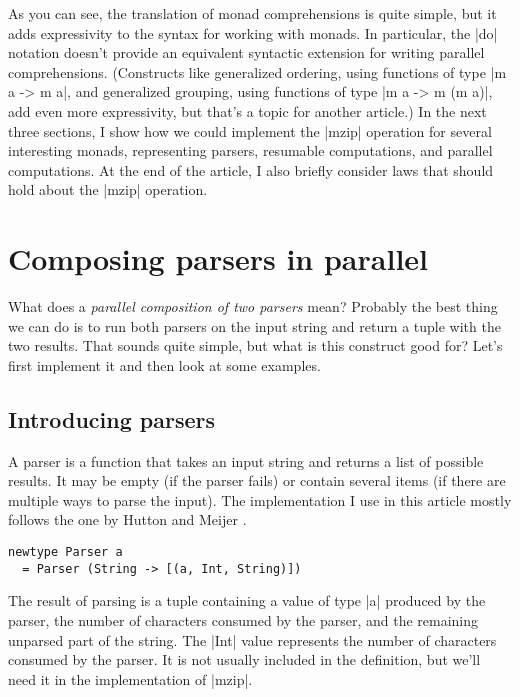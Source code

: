 \documentclass{tmr}
\newcommand{\authornote}[3]{}
\newcommand\bay[1]{\authornote{brent}{blue}{#1}}
\newcommand\tp[1]{\authornote{tomas}{red}{#1}}
\begin{document}
As you can see, the translation of monad comprehensions is quite simple, but it adds
expressivity to the syntax for working with monads. In particular, the |do| notation doesn't provide
an equivalent syntactic extension for writing parallel comprehensions. (Constructs like generalized 
ordering, using functions of type |m a -> m a|, and generalized
grouping, using functions of type
|m a -> m (m a)|, add even more expressivity, but that's a topic for another article.)
In the next three sections, I show how we could implement the |mzip| operation for several 
interesting monads, representing parsers, resumable computations, and
parallel computations. At the end of the article, I also briefly 
consider laws that should hold about the |mzip| operation.


\section{Composing parsers in parallel}
What does a \textit{parallel composition of two parsers} mean? Probably the best thing we can do 
is to run both parsers on the input string and return a tuple with the two results. That sounds
quite simple, but what is this construct good for? Let's first implement it and then look at 
some examples. 


\subsection{Introducing parsers}
\bay{I deleted the paragraph here because it seemed unnecessarily
  apologetic, and I think it was unnecessary.  However, it may also be
  possible to rewrite it if you think it is saying something important.}
\tp{Yes, deleting it looks Ok.}

A parser is a function that takes an
input string and returns a list of possible results. It may be empty (if the parser fails) or 
contain several items (if there are multiple ways to parse the input). The implementation I use 
in this article mostly follows the one by Hutton and Meijer \cite{monadparsing}.

\begin{verbatim}
newtype Parser a
  = Parser (String -> [(a, Int, String)])
\end{verbatim}
The result of parsing is a tuple containing a value of type |a| produced by the parser, the number
of characters consumed by the parser, and the remaining unparsed part of the string. The |Int| value
represents the number of characters consumed by the parser. It is not usually included in the definition,
but we'll need it in the implementation of |mzip|.
\end{document}

